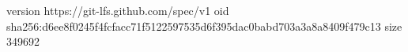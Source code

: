 version https://git-lfs.github.com/spec/v1
oid sha256:d6ee8f0245f4fcfacc71f5122597535d6f395dac0babd703a3a8a8409f479c13
size 349692
